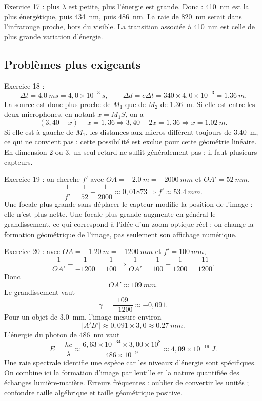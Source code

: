 \documentclass[11pt,a4paper]{article}
\begin{document}
\begin{corrbox}
Exercice 17 : plus $\lambda$ est petite, plus l'énergie est grande. Donc : \SI{410}{nm} est la plus énergétique, puis \SI{434}{nm}, puis \SI{486}{nm}. La raie de \SI{820}{nm} serait dans l'infrarouge proche, hors du visible. La transition associée à \SI{410}{nm} est celle de plus grande variation d'énergie.
\end{corrbox}

\subsection*{Problèmes plus exigeants}
\begin{corrbox}
Exercice 18 :
\[
\Delta t = \SI{4,0}{ms}=4{,}0\times10^{-3}\ \si{s},\qquad \Delta d = c\Delta t = 340\times 4{,}0\times10^{-3}=\SI{1,36}{m}.
\]
La source est donc plus proche de $M_1$ que de $M_2$ de \SI{1,36}{m}. Si elle est entre les deux microphones, en notant $x=M_1S$, on a
\[
(3{,}40-x)-x=1{,}36 \Rightarrow 3{,}40-2x=1{,}36 \Rightarrow x=\SI{1,02}{m}.
\]
Si elle est à gauche de $M_1$, les distances aux micros diffèrent toujours de \SI{3,40}{m}, ce qui ne convient pas : cette possibilité est exclue pour cette géométrie linéaire. En dimension 2 ou 3, un seul retard ne suffit généralement pas ; il faut plusieurs capteurs.
\end{corrbox}

\begin{corrbox}
Exercice 19 : on cherche $f'$ avec $OA=-\SI{2,0}{m}=-\SI{2000}{mm}$ et $OA'=\SI{52}{mm}$.
\[
\frac{1}{f'}=\frac{1}{52}-\frac{1}{2000}\approx 0{,}01873
\Rightarrow f'\approx \SI{53,4}{mm}.
\]
Une focale plus grande sans déplacer le capteur modifie la position de l'image : elle n'est plus nette. Une focale plus grande augmente en général le grandissement, ce qui correspond à l'idée d'un zoom optique réel : on change la formation géométrique de l'image, pas seulement son affichage numérique.
\end{corrbox}

\begin{corrbox}
Exercice 20 : avec $OA=-\SI{1,20}{m}=-\SI{1200}{mm}$ et $f'=\SI{100}{mm}$,
\[
\frac{1}{OA'}-\frac{1}{-1200}=\frac{1}{100}
\Rightarrow \frac{1}{OA'}=\frac{1}{100}-\frac{1}{1200}=\frac{11}{1200}.
\]
Donc
\[
OA'\approx \SI{109}{mm}.
\]
Le grandissement vaut
\[
\gamma=\frac{109}{-1200}\approx -0{,}091.
\]
Pour un objet de \SI{3,0}{mm}, l'image mesure environ
\[
|A'B'|\approx 0{,}091\times 3{,}0 \approx \SI{0,27}{mm}.
\]
L'énergie du photon de \SI{486}{nm} vaut
\[
E=\frac{hc}{\lambda}\approx \frac{6{,}63\times10^{-34}\times3{,}00\times10^8}{486\times10^{-9}}\approx 4{,}09\times10^{-19}\ \si{J}.
\]
Une raie spectrale identifie une espèce car les niveaux d'énergie sont spécifiques. On combine ici la formation d'image par lentille et la nature quantifiée des échanges lumière-matière. Erreurs fréquentes : oublier de convertir les unités ; confondre taille algébrique et taille géométrique positive.
\end{corrbox}
\end{document}
